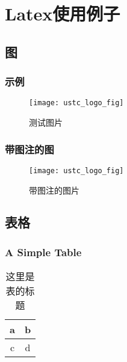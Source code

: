 \chapter{Latex使用例子}

\section{图}
\subsection{示例}
\begin{figure}[ht]
\centering
\texttt{[image: ustc\_logo\_fig]}
\caption{测试图片} \label{fig:figure1}
\end{figure}

\subsection{带图注的图}
\begin{figure}[ht]
\centering
\texttt{[image: ustc\_logo\_fig]}
\caption{带图注的图片}\label{fig:noted-figure}
\end{figure}

\section{表格}

\subsection{A Simple Table}
\begin{table}[htbp]
\centering
\caption{这里是表的标题} \label{tab:simpletable}
\begin{tabular}{|c|c|}
    \hline
    a & b \\
    \hline
    c & d \\
    \hline
\end{tabular}
\end{table}

